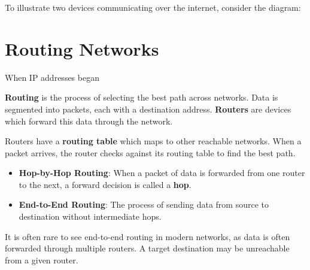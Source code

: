To illustrate two devices communicating over the internet, consider the diagram:

\section{Routing Networks}

\noindent
When IP addresses began


\begin{Def}[Routing]

    \textbf{Routing} is the process of selecting the best path across networks. 
    Data is segmented into packets, each with a destination address. 
    \textbf{Routers} are devices which forward this data through the network.

    Routers have a \textbf{routing table} which maps to other reachable networks. 
    When a packet arrives, the router checks against its routing table to find the best path.
    \hfill \cite{cloudflare_routing}
\end{Def}

\begin{Def}

    \begin{itemize}
        \item  \textbf{Hop-by-Hop Routing}: When a packet of data is forwarded from one router to the next, a forward decision is called a \textbf{hop}.
        \item \textbf{End-to-End Routing}: The process of sending data from source to destination without intermediate hops.
    \end{itemize}
    \noindent
    It is often rare to see end-to-end routing in modern networks, as data is often forwarded through multiple routers. A target 
    destination may be unreachable from a given router.
    \hfill \cite{heimlicher_e2e_hbh}
\end{Def}

\newpage

